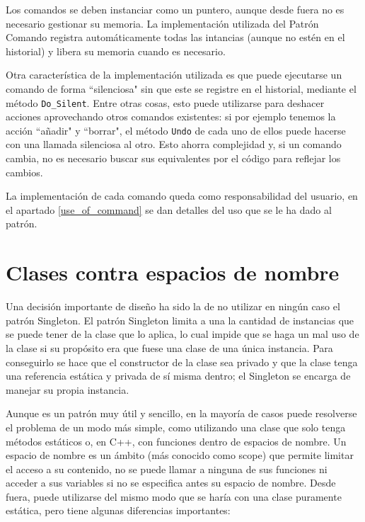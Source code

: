 Los comandos se deben instanciar como un puntero, aunque desde fuera no es necesario gestionar su memoria. La implementación utilizada del Patrón Comando registra automáticamente todas las intancias (aunque no estén en el historial) y libera su memoria cuando es necesario.

Otra característica de la implementación utilizada es que puede ejecutarse un comando de forma ``silenciosa" sin que este se registre en el historial, mediante el método \texttt{Do\_Silent}. Entre otras cosas, esto puede utilizarse para deshacer acciones aprovechando otros comandos existentes: si por ejemplo tenemos la acción ``añadir" y ``borrar", el método \texttt{Undo} de cada uno de ellos puede hacerse con una llamada silenciosa al otro. Esto ahorra complejidad y, si un comando cambia, no es necesario buscar sus equivalentes por el código para reflejar los cambios.

La implementación de cada comando queda como responsabilidad del usuario, en el apartado \ref{use_of_command} se dan detalles del uso que se le ha dado al patrón.


\section{Clases contra espacios de nombre}
Una decisión importante de diseño ha sido la de no utilizar en ningún caso el patrón Singleton. El patrón Singleton limita a una la cantidad de instancias que se puede tener de la clase que lo aplica, lo cual impide que se haga un mal uso de la clase si su propósito era que fuese una clase de una única instancia. Para conseguirlo se hace que el constructor de la clase sea privado y que la clase tenga una referencia estática y privada de sí misma dentro; el Singleton se encarga de manejar su propia instancia.

Aunque es un patrón muy útil y sencillo, en la mayoría de casos puede resolverse el problema de un modo más simple, como utilizando una clase que solo tenga métodos estáticos o, en C++, con funciones dentro de espacios de nombre. Un espacio de nombre es un ámbito (más conocido como scope) que permite limitar el acceso a su contenido, no se puede llamar a ninguna de sus funciones ni acceder a sus variables si no se especifica antes su espacio de nombre. Desde fuera, puede utilizarse del mismo modo que se haría con una clase puramente estática, pero tiene algunas diferencias importantes:

